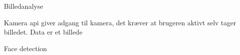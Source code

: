 Billedanalyse

Kamera api giver adgang til kamera, det kræver at brugeren aktivt selv tager billedet.
Data er et billede


Face detection
